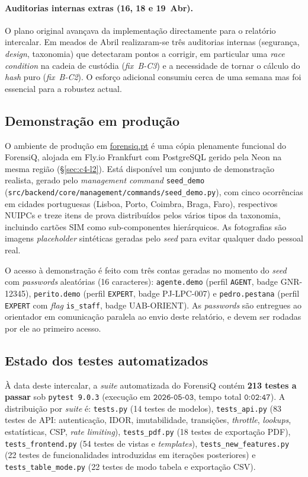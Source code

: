 \paragraph{Auditorias internas extras (16, 18 e 19~Abr).}
O plano original avançava da implementação directamente para o
relatório intercalar. Em meados de Abril realizaram-se três
auditorias internas (segurança, \emph{design}, taxonomia) que
detectaram pontos a corrigir, em particular uma \emph{race
condition} na cadeia de custódia (\emph{fix~B-C3}) e a necessidade
de tornar o cálculo do \emph{hash} puro (\emph{fix~B-C2}). O esforço
adicional consumiu cerca de uma semana mas foi essencial para a
robustez actual.

\subsection{Demonstração em produção}
\label{sec:demo}

O ambiente de produção em \href{https://forensiq.pt}{forensiq.pt} é
uma cópia plenamente funcional do ForensiQ, alojada em Fly.io
Frankfurt com PostgreSQL gerido pela Neon na mesma região
(\S\ref{sec:c4-l2}). Está disponível um conjunto de demonstração
realista, gerado pelo \emph{management command}
\texttt{seed\_demo} (\texttt{src/backend/core/management/commands/seed\_demo.py}),
com cinco ocorrências em cidades portuguesas (Lisboa, Porto,
Coimbra, Braga, Faro), respectivos NUIPCs e treze itens de prova
distribuídos pelos vários tipos da taxonomia, incluindo cartões SIM
como sub-componentes hierárquicos. As fotografias são imagens
\emph{placeholder} sintéticas geradas pelo \emph{seed} para evitar
qualquer dado pessoal real.

O acesso à demonstração é feito com três contas geradas no momento
do \emph{seed} com \emph{passwords} aleatórias (16 caracteres):
\texttt{agente.demo} (perfil \texttt{AGENT}, badge GNR-12345),
\texttt{perito.demo} (perfil \texttt{EXPERT}, badge PJ-LPC-007) e
\texttt{pedro.pestana} (perfil \texttt{EXPERT} com \emph{flag}
\texttt{is\_staff}, badge UAB-ORIENT). As \emph{passwords} são
entregues ao orientador em comunicação paralela ao envio deste
relatório, e devem ser rodadas por ele ao primeiro acesso.

\subsection{Estado dos testes automatizados}
\label{sec:tests-state}

À data deste intercalar, a \emph{suite} automatizada do ForensiQ
contém \textbf{213 testes a passar} sob \texttt{pytest 9.0.3}
(execução em \(\texttt{2026{-}05{-}03}\), tempo total
\(\texttt{0:02:47}\)). A distribuição por \emph{suite} é:
\texttt{tests.py} (14 testes de modelos), \texttt{tests\_api.py}
(83 testes de API: autenticação, IDOR, imutabilidade, transições,
\emph{throttle}, \emph{lookups}, estatísticas, CSP, \emph{rate
limiting}), \texttt{tests\_pdf.py} (18 testes de exportação PDF),
\texttt{tests\_frontend.py} (54 testes de vistas e \emph{templates}),
\texttt{tests\_new\_features.py} (22 testes de funcionalidades
introduzidas em iterações posteriores) e \texttt{tests\_table\_mode.py}
(22 testes de modo tabela e exportação CSV).

